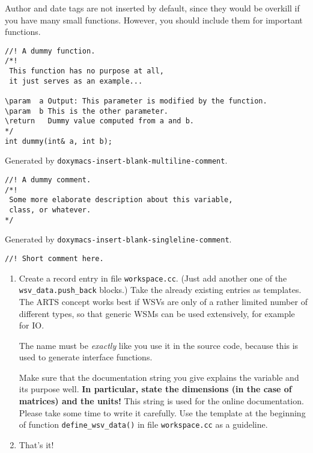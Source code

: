 Author and date tags are not inserted by default, since they would be
overkill if you have many small functions. However, you should include
them for important functions. 

\begin{verbatim}
//! A dummy function.
/*! 
 This function has no purpose at all,
 it just serves as an example... 

\param  a Output: This parameter is modified by the function.
\param  b This is the other parameter.         
\return   Dummy value computed from a and b.         
*/
int dummy(int& a, int b);
\end{verbatim}


Generated by \verb|doxymacs-insert-blank-multiline-comment|.

\begin{verbatim}
//! A dummy comment.
/*! 
 Some more elaborate description about this variable, 
 class, or whatever. 
*/
\end{verbatim}


Generated by \verb|doxymacs-insert-blank-singleline-comment|.

\begin{verbatim}
//! Short comment here.
\end{verbatim}


 \label{sec:development:extending}

\begin{enumerate}
\item Create a record entry in file \verb|workspace.cc|. (Just add
  another one of the \verb|wsv_data.push_back| blocks.) Take the
  already existing entries as templates. The ARTS concept works best
  if WSVs are only of a rather limited number of different types, so
  that generic WSMs can be used extensively, for example for IO.
      
  The name must be \emph{exactly} like you use it in the source code,
  because this is used to generate interface functions.
  
  Make sure that the documentation string you give explains the
  variable and its purpose well. \textbf{In particular, state the
    dimensions (in the case of matrices) and the units!} This string
  is used for the online documentation. Please take some time to write
  it carefully. Use the template at the beginning of function
  \verb|define_wsv_data()| in file \verb|workspace.cc| as a
  guideline. 

\item That's it!
\end{enumerate}


